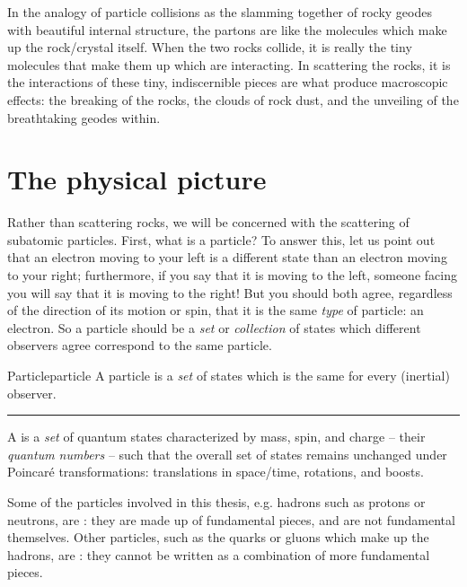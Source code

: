 In the analogy of particle collisions as the slamming together of rocky geodes with beautiful internal structure, the partons are like the molecules which make up the rock/crystal itself.
%
When the two rocks collide, it is really the tiny molecules that make them up which are interacting.
%
In scattering the rocks, it is the interactions of these tiny, indiscernible pieces are what produce macroscopic effects:
%
the breaking of the rocks, the clouds of rock dust, and the unveiling of the breathtaking geodes within.


\section{The physical picture}


Rather than scattering rocks, we will be concerned with the scattering of subatomic particles.
%
First, what is a particle?
%
To answer this, let us point out that an electron moving to your left is a different state than an electron moving to your right;
%
furthermore, if you say that it is moving to the left, someone facing you will say that it is moving to the right!
%
But you should both agree, regardless of the direction of its motion or spin, that it is the same \textit{type} of particle:
%
an electron.
%
So a particle should be a \textit{set} or \textit{collection} of states which different observers agree correspond to the same particle.

\begin{definitionbox}{Particle}{particle}
    A particle is a \textit{set} of states which is the same for every (inertial) observer.

    \vspace{7pt}
    \hrule
    \vspace{7pt}

    A  is a \textit{set} of quantum states characterized by mass, spin, and charge -- their \textit{quantum numbers} -- such that the overall set of states remains unchanged under Poincar\'e transformations:
    translations in space/time, rotations, and boosts.
\end{definitionbox}

Some of the particles involved in this thesis, e.g. hadrons such as protons or neutrons, are :
%
they are made up of fundamental pieces, and are not fundamental themselves.
%
Other particles, such as the quarks or gluons which make up the hadrons, are :
%
they cannot be written as a combination of more fundamental pieces.


